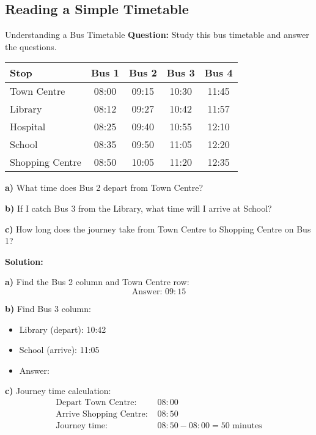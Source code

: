 \documentclass[12pt,a4paper]{article}
\begin{document}
\subsection{Reading a Simple Timetable}

\begin{examplebox}{Understanding a Bus Timetable}
\textbf{Question:} Study this bus timetable and answer the questions.

\begin{center}
\begin{tabular}{l|cccc}
\toprule
\textbf{Stop} & \textbf{Bus 1} & \textbf{Bus 2} & \textbf{Bus 3} & \textbf{Bus 4} \\
\midrule
Town Centre & 08:00 & 09:15 & 10:30 & 11:45 \\
Library & 08:12 & 09:27 & 10:42 & 11:57 \\
Hospital & 08:25 & 09:40 & 10:55 & 12:10 \\
School & 08:35 & 09:50 & 11:05 & 12:20 \\
Shopping Centre & 08:50 & 10:05 & 11:20 & 12:35 \\
\bottomrule
\end{tabular}
\end{center}

\textbf{a)} What time does Bus 2 depart from Town Centre?

\textbf{b)} If I catch Bus 3 from the Library, what time will I arrive at School?

\textbf{c)} How long does the journey take from Town Centre to Shopping Centre on Bus 1?

\textbf{Solution:}

\textbf{a)} Find the Bus 2 column and Town Centre row:
\[\text{Answer: } \boxed{09:15}\]

\textbf{b)} Find Bus 3 column:
\begin{itemize}
\item Library (depart): 10:42
\item School (arrive): 11:05
\item Answer: 
\end{itemize}

\textbf{c)} Journey time calculation:
\begin{align*}
\text{Depart Town Centre: } &08:00 \\
\text{Arrive Shopping Centre: } &08:50 \\
\text{Journey time: } &08:50 - 08:00 = \boxed{50\text{ minutes}}
\end{align*}
\end{examplebox}
\end{document}
